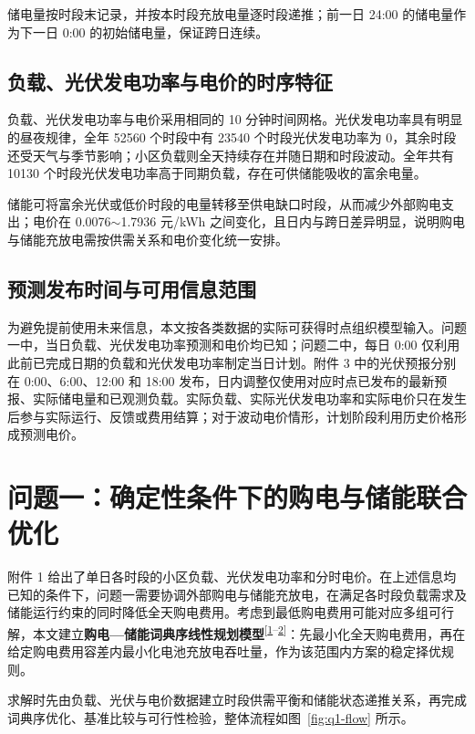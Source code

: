 \documentclass[12pt,a4paper]{ctexart}
\newcommand{\paperciterange}[2]{\textsuperscript{[\hyperref[ref:#1]{#1}--\hyperref[ref:#2]{#2}]}}
\renewcommand{\textbf}[1]{{\CJKfamily{heiti}\bfseries #1}}
\begin{document}
储电量按时段末记录，并按本时段充放电量逐时段递推；前一日 24:00 的储电量作为下一日 0:00 的初始储电量，保证跨日连续。
\subsection{负载、光伏发电功率与电价的时序特征}
负载、光伏发电功率与电价采用相同的 10 分钟时间网格。光伏发电功率具有明显的昼夜规律，全年 52560 个时段中有 23540 个时段光伏发电功率为 0，其余时段还受天气与季节影响；小区负载则全天持续存在并随日期和时段波动。全年共有 10130 个时段光伏发电功率高于同期负载，存在可供储能吸收的富余电量。

\par\noindent\hspace*{2em}储能可将富余光伏或低价时段的电量转移至供电缺口时段，从而减少外部购电支出；电价在 0.0076$\sim$1.7936 元/kWh 之间变化，且日内与跨日差异明显，说明购电与储能充放电需按供需关系和电价变化统一安排。
\subsection{预测发布时间与可用信息范围}
为避免提前使用未来信息，本文按各类数据的实际可获得时点组织模型输入。问题一中，当日负载、光伏发电功率预测和电价均已知；问题二中，每日 0:00 仅利用此前已完成日期的负载和光伏发电功率制定当日计划。附件 3 中的光伏预报分别在 0:00、6:00、12:00 和 18:00 发布，日内调整仅使用对应时点已发布的最新预报、实际储电量和已观测负载。实际负载、实际光伏发电功率和实际电价只在发生后参与实际运行、反馈或费用结算；对于波动电价情形，计划阶段利用历史价格形成预测电价。

\titlespacing*{\section}{0pt}{2.5em}{0.6em}
\section{问题一：确定性条件下的购电与储能联合优化}
附件 1 给出了单日各时段的小区负载、光伏发电功率和分时电价。在上述信息均已知的条件下，问题一需要协调外部购电与储能充放电，在满足各时段负载需求及储能运行约束的同时降低全天购电费用。考虑到最低购电费用可能对应多组可行解，本文建立\textbf{购电—储能词典序线性规划模型}\paperciterange{1}{2}：先最小化全天购电费用，再在给定购电费用容差内最小化电池充放电吞吐量，作为该范围内方案的稳定择优规则。

\par\noindent\hspace*{2em}求解时先由负载、光伏与电价数据建立时段供需平衡和储能状态递推关系，再完成词典序优化、基准比较与可行性检验，整体流程如图~\ref{fig:q1-flow} 所示。
\end{document}
